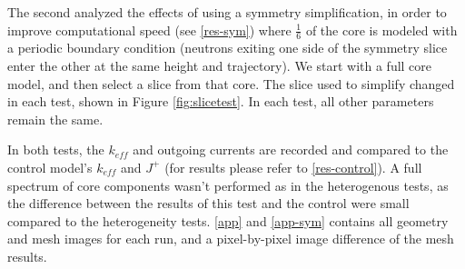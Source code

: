 

The second analyzed the effects of using a symmetry simplification, in order to improve computational speed (see \autoref{res-sym}) where $\frac{1}{6}$ of the core is modeled with a periodic boundary condition (neutrons exiting one side of the symmetry slice enter the other at the same height and trajectory).  We start with a full core model, and then select a slice from that core.  The slice used to simplify changed in each test, shown in Figure \ref{fig:slicetest}.  In each test, all other parameters remain the same.



In both tests, the $k_{eff}$ and outgoing currents are recorded and compared to the control model's $k_{eff}$ and $J^+$ (for results please refer to \autoref{res-control}).  A full spectrum of core components wasn't performed as in the heterogenous tests, as the difference between the results of this test and the control were small compared to the heterogeneity tests.  \autoref{app} and \autoref{app-sym} contains all geometry and mesh images for each run, and a pixel-by-pixel image difference of the mesh results.